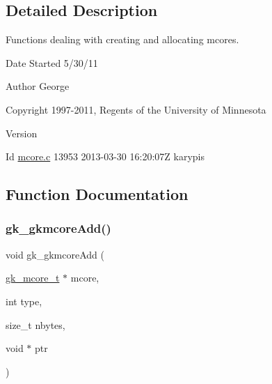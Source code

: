 \subsection{Detailed Description}
Functions dealing with creating and allocating mcores. 

\begin{DoxyDate}{Date}
Started 5/30/11 
\end{DoxyDate}
\begin{DoxyAuthor}{Author}
George 

Copyright 1997-\/2011, Regents of the University of Minnesota 
\end{DoxyAuthor}
\begin{DoxyVersion}{Version}

\end{DoxyVersion}
\begin{DoxyParagraph}{Id}
\hyperlink{a00107}{mcore.\+c} 13953 2013-\/03-\/30 16\+:20\+:07Z karypis 
\end{DoxyParagraph}


\subsection{Function Documentation}
\mbox{\label{a00107_a3777d3929aad6ae5e17b76656cd6797b}} 
\subsubsection{\texorpdfstring{gk\+\_\+gkmcore\+Add()}{gk\_gkmcoreAdd()}}
{\footnotesize\ttfamily void gk\+\_\+gkmcore\+Add (\begin{DoxyParamCaption}\item[{\hyperlink{a00682}{gk\+\_\+mcore\+\_\+t} $\ast$}]{mcore,  }\item[{int}]{type,  }\item[{size\+\_\+t}]{nbytes,  }\item[{void $\ast$}]{ptr }\end{DoxyParamCaption})}

